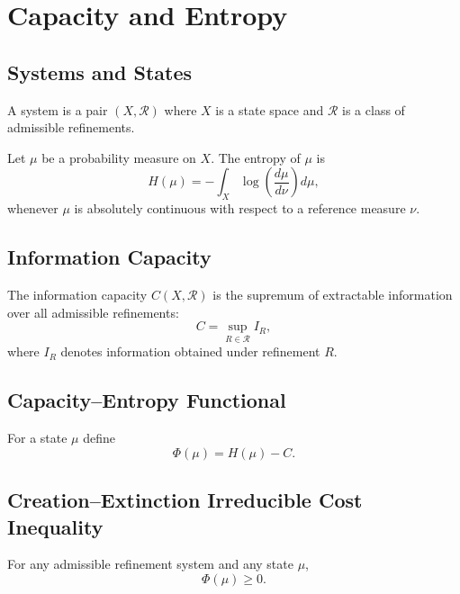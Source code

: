 \chapter{Capacity and Entropy}

\section{Systems and States}

\begin{definition}[System]
A system is a pair $(X,\mathcal{R})$ where $X$ is a state space and $\mathcal{R}$ is a class of admissible refinements.
\end{definition}

\begin{definition}[Entropy]
Let $\mu$ be a probability measure on $X$. The entropy of $\mu$ is
\[
H(\mu) = - \int_X \log \left(\frac{d\mu}{d\nu}\right) d\mu,
\]
whenever $\mu$ is absolutely continuous with respect to a reference measure $\nu$.
\end{definition}

\section{Information Capacity}

\begin{definition}
The information capacity $C(X,\mathcal{R})$ is the supremum of extractable information over all admissible refinements:
\[
C = \sup_{R \in \mathcal{R}} I_R,
\]
where $I_R$ denotes information obtained under refinement $R$.
\end{definition}

\section{Capacity--Entropy Functional}

\begin{definition}
For a state $\mu$ define
\[
\Phi(\mu) = H(\mu) - C.
\]
\end{definition}

\section{Creation--Extinction Irreducible Cost Inequality}

\begin{theorem}[CEICI]
For any admissible refinement system and any state $\mu$,
\[
\Phi(\mu) \ge 0.
\]
\end{theorem}

